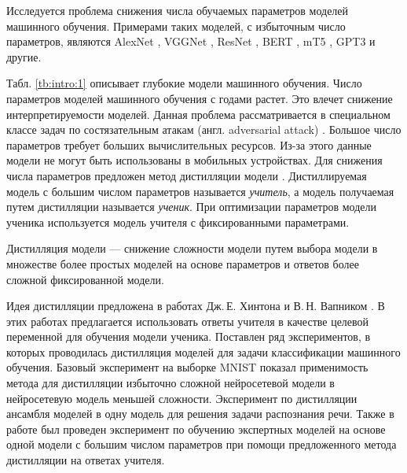 Исследуется проблема снижения числа обучаемых параметров моделей машинного обучения. Примерами таких моделей, с избыточным число параметров, являются AlexNet \cite{Krizhevsky2012}, VGGNet \cite{Simonyan2014}, ResNet \cite{Kaiming2015}, BERT \cite{Devlin2018, Vaswani2017}, mT5 \cite{Linting2021}, GPT3\cite{Brown2020} и другие.
\begin{table}[h!]
\caption{Число параметров в моделях машинного обучения.}
\label{tb:intro:1}
\begin{center}
\end{center}
\end{table}
Табл. \ref{tb:intro:1} описывает глубокие модели машинного обучения.
Число параметров моделей машинного обучения с годами растет.
Это влечет снижение интерпретируемости моделей.
Данная проблема рассматривается в специальном классе задач по состязательным атакам (англ. adversarial attack) \cite{Zheng2020}.
Большое число параметров требует больших вычислительных ресурсов.
Из-за этого данные модели не могут быть использованы в мобильных устройствах.
Для снижения числа параметров предложен метод дистилляции модели \cite{Hinton2015, Vapnik2015, Lopez2016}.
Дистиллируемая модель с большим числом параметров называется \textit{учитель}, а модель получаемая путем дистилляции называется \textit{ученик}.
При оптимизации параметров модели ученика используется модель учителя с фиксированными параметрами.
\begin{definition}
Дистилляция модели --- снижение сложности модели путем выбора модели в множестве более простых моделей на основе параметров и ответов более сложной фиксированной модели.
\end{definition}

Идея дистилляции предложена в работах Дж.\,Е. Хинтона и В.\,Н. Вапником \cite{Hinton2015, Vapnik2015, Lopez2016}. В этих работах предлагается использовать ответы учителя в качестве целевой переменной для обучения модели ученика.
Поставлен ряд экспериментов, в которых проводилась дистилляция моделей для задачи классификации машинного обучения.
Базовый эксперимент на выборке MNIST \cite{mnist} показал применимость метода для дистилляции избыточно сложной нейросетевой модели в нейросетевую модель меньшей сложности.
Эксперимент по дистилляции ансамбля моделей в одну модель для решения задачи распознания речи. Также в работе \cite{Hinton2015} был проведен эксперимент по обучению экспертных моделей на основе одной модели с большим числом параметров при помощи предложенного метода дистилляции на ответах учителя.

